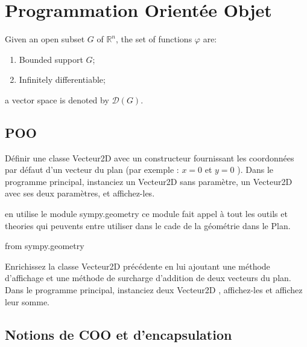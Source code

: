 \documentclass[11pt,fleqn]{book} %
\begin{document}
\section{Programmation Orientée Objet}
\begin{notation}
Given an open subset $G$ of $\mathbb{R}^n$, the set of functions $\varphi$ are:
\begin{enumerate}
\item Bounded support $G$;
\item Infinitely differentiable;
\end{enumerate}
a vector space is denoted by $\mathcal{D}(G)$. 
\end{notation}

 \subsection{POO}
\begin{exercise}
 Définir une classe Vecteur2D avec un constructeur fournissant les coordonnées par
défaut d’un vecteur du plan (par exemple : $x = 0$ et $y = 0$ ).
Dans le programme principal, instanciez un Vecteur2D sans paramètre, un Vecteur2D
avec ses deux paramètres, et affichez-les.
\end{exercise}
\begin{solution}
 en utilise le module sympy.geometry ce module fait appel à tout les outils et theories qui
 peuvents entre utiliser dans le cade de la géométrie dans le Plan.
 \begin{python}
 from sympy.geometry
  \end{python}
\end{solution}

\begin{exercise}
Enrichissez la classe Vecteur2D précédente en lui ajoutant une méthode d’affichage
et une méthode de surcharge d’addition de deux vecteurs du plan.
Dans le programme principal, instanciez deux Vecteur2D , affichez-les et affichez leur
somme.
\end{exercise}
\begin{solution}
\end{solution}

\subsection{Notions de COO et d’encapsulation}
\end{document}
